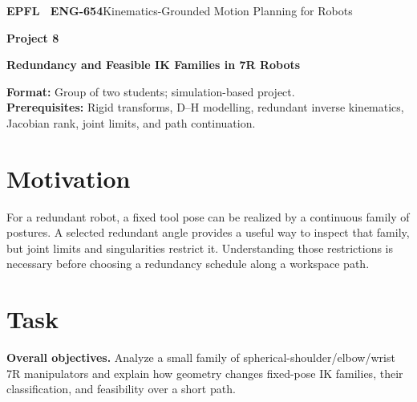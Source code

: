\documentclass[11pt,a4paper]{article}
\begin{document}
{\small\textbf{EPFL \textbar\ ENG-654}\hfill Kinematics-Grounded Motion Planning for Robots}
\vspace{5mm}

{\color{epflred}\Large\bfseries Project 8}

{\LARGE\bfseries Redundancy and Feasible IK Families in 7R Robots\par}

\textbf{Format:} Group of two students; simulation-based project.\\
\textbf{Prerequisites:} Rigid transforms, D--H modelling, redundant inverse
kinematics, Jacobian rank, joint limits, and path continuation.

\section*{Motivation}
For a redundant robot, a fixed tool pose can be realized by a continuous
family of postures. A selected redundant angle provides a useful way to inspect
that family, but joint limits and singularities restrict it. Understanding
those restrictions is necessary before choosing a redundancy schedule along
a workspace path.

\section*{Task}
\textbf{Overall objectives.} Analyze a small family of spherical-shoulder/elbow/wrist 7R manipulators
and explain how geometry changes fixed-pose IK families, their classification,
and feasibility over a short path.
\end{document}
